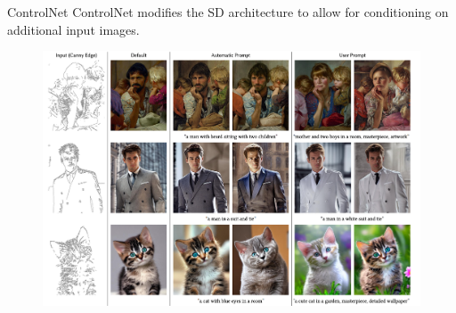 \documentclass[8pt]{beamer}
\begin{document}
\begin{frame}{ControlNet}
    ControlNet modifies the SD architecture to allow for conditioning on additional input images.
   \begin{figure}
       \includegraphics[scale=0.17]{images/control_net_generated_images}
       \label{fig:control_net_generated_images}
   \end{figure}~\cite{zhang2023adding}
\end{frame}
\end{document}
